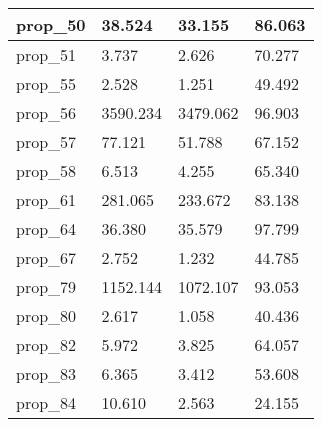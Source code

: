 \begin{tabular}{|llll|}
prop_50 & 38.524 & 33.155 & 86.063\\\midrule
prop_51 & 3.737 & 2.626 & 70.277\\\midrule
prop_55 & 2.528 & 1.251 & 49.492\\\midrule
prop_56 & 3590.234 & 3479.062 & 96.903\\\midrule
prop_57 & 77.121 & 51.788 & 67.152\\\midrule
prop_58 & 6.513 & 4.255 & 65.340\\\midrule
prop_61 & 281.065 & 233.672 & 83.138\\\midrule
prop_64 & 36.380 & 35.579 & 97.799\\\midrule
prop_67 & 2.752 & 1.232 & 44.785\\\midrule
prop_79 & 1152.144 & 1072.107 & 93.053\\\midrule
prop_80 & 2.617 & 1.058 & 40.436\\\midrule
prop_82 & 5.972 & 3.825 & 64.057\\\midrule
prop_83 & 6.365 & 3.412 & 53.608\\\midrule
prop_84 & 10.610 & 2.563 & 24.155\\\midrule
\hline
\end{tabular}
